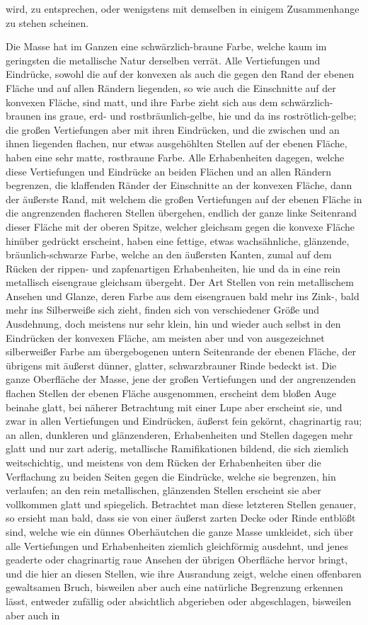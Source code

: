 \documentclass[a4paper, 11pt, oneside, german]{article}
\begin{document}
wird, zu entsprechen, oder wenigstens mit demselben in einigem Zusammenhange zu stehen scheinen.

Die Masse hat im Ganzen eine schwärzlich-braune Farbe, welche kaum im geringsten die metallische Natur derselben verrät. Alle Vertiefungen und Eindrücke, sowohl die auf der konvexen als auch die gegen den Rand der ebenen Fläche und auf allen Rändern liegenden, so wie auch die Einschnitte auf der konvexen Fläche, sind matt, und ihre Farbe zieht sich aus dem schwärzlich-braunen ins graue, erd- und rostbräunlich-gelbe, hie und da ins roströtlich-gelbe; die großen Vertiefungen aber mit ihren Eindrücken, und die zwischen und an ihnen liegenden flachen, nur etwas ausgehöhlten Stellen auf der ebenen Fläche, haben eine sehr matte, rostbraune Farbe. Alle Erhabenheiten dagegen, welche diese Vertiefungen und Eindrücke an beiden Flächen und an allen Rändern begrenzen, die klaffenden Ränder der Einschnitte an der konvexen Fläche, dann der äußerste Rand, mit welchem die großen Vertiefungen auf der ebenen Fläche in die angrenzenden flacheren Stellen übergehen, endlich der ganze linke Seitenrand dieser Fläche mit der oberen Spitze, welcher gleichsam gegen die konvexe Fläche hinüber gedrückt erscheint, haben eine fettige, etwas wachsähnliche, glänzende, bräunlich-schwarze Farbe, welche an den äußersten Kanten, zumal auf dem Rücken der rippen- und zapfenartigen Erhabenheiten, hie und da in eine rein metallisch eisengraue gleichsam übergeht. Der Art Stellen von rein metallischem Ansehen und Glanze, deren Farbe aus dem eisengrauen bald mehr ins Zink-, bald mehr ins Silberweiße sich zieht, finden sich von verschiedener Größe und Ausdehnung, doch meistens nur sehr klein, hin und wieder auch selbst in den Eindrücken der konvexen Fläche, am meisten aber und von ausgezeichnet silberweißer Farbe am übergebogenen untern Seitenrande der ebenen Fläche, der übrigens mit äußerst dünner, glatter, schwarzbrauner Rinde bedeckt ist. Die ganze Oberfläche der Masse, jene der großen Vertiefungen und der angrenzenden flachen Stellen der ebenen Fläche ausgenommen, erscheint dem bloßen Auge beinahe glatt, bei näherer Betrachtung mit einer Lupe aber erscheint sie, und zwar in allen Vertiefungen und Eindrücken, äußerst fein gekörnt, chagrinartig rau; an allen, dunkleren und glänzenderen, Erhabenheiten und Stellen dagegen mehr glatt und nur zart aderig, metallische Ramifikationen bildend, die sich ziemlich weitschichtig, und meistens von dem Rücken der Erhabenheiten über die Verflachung zu beiden Seiten gegen die Eindrücke, welche sie begrenzen, hin verlaufen; an den rein metallischen, glänzenden Stellen erscheint sie aber vollkommen glatt und spiegelich. Betrachtet man diese letzteren Stellen genauer, so ersieht man bald, dass sie von einer äußerst zarten Decke oder Rinde entblößt sind, welche wie ein dünnes Oberhäutchen die ganze Masse umkleidet, sich über alle Vertiefungen und Erhabenheiten ziemlich gleichförmig ausdehnt, und jenes geaderte oder chagrinartig raue Ansehen der übrigen Oberfläche hervor bringt, und die hier an diesen Stellen, wie ihre Ausrandung zeigt, welche einen offenbaren gewaltsamen Bruch, bisweilen aber auch eine natürliche Begrenzung erkennen lässt, entweder zufällig oder absichtlich abgerieben oder abgeschlagen, bisweilen aber auch in 
\end{document}
